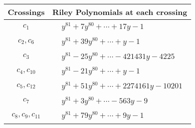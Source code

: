 \documentclass[1p]{elsarticle_modified}
\theoremstyle{definition}
\begin{document}
\begin{tabular}{m{50pt}|m{274pt}}
Crossings & \hspace{64pt}Riley Polynomials at each crossing \\
\hline $$\begin{aligned}c_{1}\end{aligned}$$&$\begin{aligned}
&y^{81}+7 y^{80}+\cdots+17 y-1
\end{aligned}$\\
\hline $$\begin{aligned}c_{2},c_{6}\end{aligned}$$&$\begin{aligned}
&y^{81}+39 y^{80}+\cdots+y-1
\end{aligned}$\\
\hline $$\begin{aligned}c_{3}\end{aligned}$$&$\begin{aligned}
&y^{81}-25 y^{80}+\cdots-421431 y-4225
\end{aligned}$\\
\hline $$\begin{aligned}c_{4},c_{10}\end{aligned}$$&$\begin{aligned}
&y^{81}-21 y^{80}+\cdots+y-1
\end{aligned}$\\
\hline $$\begin{aligned}c_{5},c_{12}\end{aligned}$$&$\begin{aligned}
&y^{81}+51 y^{80}+\cdots+2274161 y-10201
\end{aligned}$\\
\hline $$\begin{aligned}c_{7}\end{aligned}$$&$\begin{aligned}
&y^{81}+3 y^{80}+\cdots-563 y-9
\end{aligned}$\\
\hline $$\begin{aligned}c_{8},c_{9},c_{11}\end{aligned}$$&$\begin{aligned}
&y^{81}+79 y^{80}+\cdots+9 y-1
\end{aligned}$\\
\hline
\end{tabular}
\vskip 2pc
\end{document}
